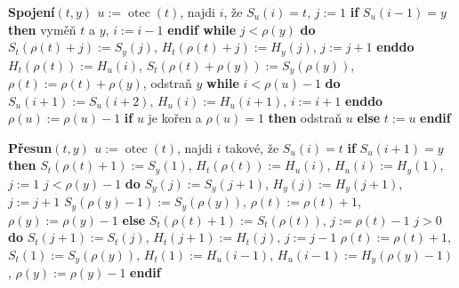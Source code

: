 \documentclass[a4paper,12pt]{article}
\DeclareMathOperator*{\otec}{otec}
\begin{document}
{\bf Spojení$(t,y)$\newline 
$u:=\otec(t)$}, najdi $i$, že $S_u(i)=t$, $j:=1$\newline 
{\bf if} $S_u(i-1)=y$ {\bf then} vyměň $t$ a $y$, $i:=i-1$ {\bf endif\newline 
while} $j<\rho (y)$ {\bf do}\newline 
\phantom{---}$S_t(\rho (t)+j):=S_y(j)$, $H_t(\rho (t)+j):=H_y(j)$, $j:=j+1$\newline 
{\bf enddo}\newline 
$H_t(\rho (t)):=H_u(i)$, $S_t(\rho (t)+\rho (y)):=S_y(\rho (y))$, $
\rho (t):=\rho (t)+\rho (y)$, odstraň $y$\newline 
{\bf while} $i<\rho (u)-1$ {\bf do}\newline 
\phantom{---}$S_u(i+1):=S_u(i+2)$, $H_u(i):=H_u(i+1)$, $i:=i+1$\newline 
{\bf enddo}\newline 
$\rho (u):=\rho (u)-1$\newline 
{\bf if} $u$ je kořen a $\rho (u)=1$ {\bf then}\newline 
\phantom{---}odstraň $u$\newline 
{\bf else}\newline 
\phantom{---}$t:=u$\newline 
{\bf endif}

{\bf Přesun$(t,y)$\newline 
$u:=\otec(t)$}, najdi $i$ takové, že $S_u(i)=t$\newline 
{\bf if} $S_u(i+1)=y$ {\bf then}\newline 
\phantom{---}$S_t(\rho (t)+1):=S_y(1)$, $H_t(\rho (t)):=H_u(i)$,\newline 
\phantom{---}$H_u(i):=H_y(1)$, $j:=1$\newline 
\phantom{---}{\bf while} $j<\rho (y)-1$ {\bf do}\newline 
\phantom{------}$S_y(j):=S_y(j+1)$, $H_y(j):=H_y(j+1)$, $j:=j+1$\newline 
\phantom{---}{\bf enddo}\newline 
\phantom{---}$S_y(\rho (y)-1):=S_y(\rho (y))$, $\rho (t):=\rho (t)+1$, $\rho 
(y):=\rho (y)-1$\newline 
{\bf else}\newline
\phantom{---}$S_t(\rho (t)+1):=S_t(\rho (t))$, $j:=\rho (t)-1$\newline 
\phantom{---}{\bf while} $j>0$ {\bf do}\newline 
\phantom{------}$S_t(j+1):=S_t(j)$, $H_t(j+1):=H_t(j)$, $j:=j-1$\newline 
\phantom{---}{\bf enddo}\newline 
\phantom{---}$\rho (t):=\rho (t)+1$, $S_t(1):=S_y(\rho (y))$, $H_t(1):=H_u(i-
1)$,\newline 
\phantom{---}$H_u(i-1):=H_y(\rho (y)-1)$, $\rho (y):=\rho (y)-1$\newline 
{\bf endif}
\end{document}
